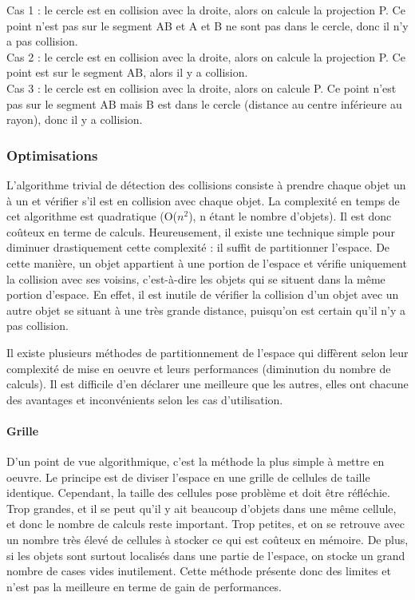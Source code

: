 \documentclass{report}
\begin{document}
Cas 1 : le cercle est en collision avec la droite, alors on calcule la projection P. Ce point n’est pas sur le segment AB et A et B ne sont pas dans le cercle, donc il n’y a pas collision. \\

Cas 2 : le cercle est en collision avec la droite, alors on calcule la projection P. Ce point est sur le segment AB, alors il y a collision. \\

Cas 3 : le cercle est en collision avec la droite, alors on calcule P. Ce point n’est pas sur le segment AB mais B est dans le cercle (distance au centre inférieure au rayon), donc il y a collision.

\subsubsection{Optimisations}

L’algorithme trivial de détection des collisions consiste à prendre chaque objet un à un et vérifier s’il est en collision avec chaque objet. La complexité en temps de cet algorithme est quadratique (O($n^2$), n étant le nombre d’objets). Il est donc coûteux en terme de calculs. Heureusement, il existe une technique simple pour diminuer drastiquement cette complexité : il suffit de partitionner l’espace. De cette manière, un objet appartient à une portion de l’espace et vérifie uniquement la collision avec ses voisins, c’est-à-dire les objets qui se situent dans la même portion d’espace. En effet, il est inutile de vérifier la collision d’un objet avec un autre objet se situant à une très grande distance, puisqu’on est certain qu’il n’y a pas collision.

Il existe plusieurs méthodes de partitionnement de l’espace qui diffèrent selon leur complexité de mise en oeuvre et leurs performances (diminution du nombre de calculs). Il est difficile d’en déclarer une meilleure que les autres, elles ont chacune des avantages et inconvénients selon les cas d’utilisation.

\paragraph{Grille}

D’un point de vue algorithmique, c’est la méthode la plus simple à mettre en oeuvre.
Le principe est de diviser l’espace en une grille de cellules de taille identique. Cependant, la taille des cellules pose problème et doit être réfléchie. Trop grandes, et il se peut qu’il y ait beaucoup d’objets dans une même cellule, et donc le nombre de calculs reste important. Trop petites, et on se retrouve avec un nombre très élevé de cellules à stocker ce qui est coûteux en mémoire. De plus, si les objets sont surtout localisés dans une partie de l’espace, on stocke un grand nombre de cases vides inutilement. Cette méthode présente donc des limites et n’est pas la meilleure en terme de gain de performances. \\
\end{document}
